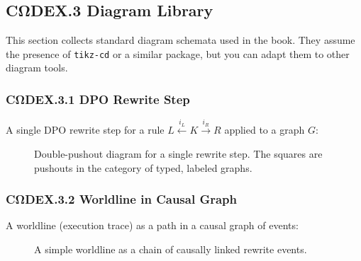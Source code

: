 \subsection*{CΩDEX.3 \quad Diagram Library}

This section collects standard diagram schemata used in the book.
They assume the presence of \texttt{tikz-cd} or a similar package,
but you can adapt them to other diagram tools.

\subsubsection*{CΩDEX.3.1 \quad DPO Rewrite Step}

A single DPO rewrite step for a rule
$L \xleftarrow{i_L} K \xrightarrow{i_R} R$ applied to a graph $G$:

\begin{figure}[h]
  \centering
  \caption{Double-pushout diagram for a single rewrite step. The squares
           are pushouts in the category of typed, labeled graphs.}
  \label{fig:codex-dpo-diagram}
\end{figure}

\subsubsection*{CΩDEX.3.2 \quad Worldline in Causal Graph}

A worldline (execution trace) as a path in a causal graph of events:

\begin{figure}[h]
  \centering
  \caption{A simple worldline as a chain of causally linked rewrite events.}
  \label{fig:worldline}
\end{figure}

